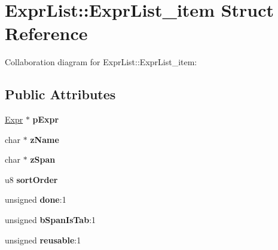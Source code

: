\hypertarget{struct_expr_list_1_1_expr_list__item}{\section{Expr\+List\+:\+:Expr\+List\+\_\+item Struct Reference}
\label{struct_expr_list_1_1_expr_list__item}
}


Collaboration diagram for Expr\+List\+:\+:Expr\+List\+\_\+item\+:
\subsection*{Public Attributes}
\begin{DoxyCompactItemize}
\item 
\hypertarget{struct_expr_list_1_1_expr_list__item_a75906cf3ff19e5bf16373fec7f3c79ad}{\hyperlink{struct_expr}{Expr} $\ast$ {\bfseries p\+Expr}}\label{struct_expr_list_1_1_expr_list__item_a75906cf3ff19e5bf16373fec7f3c79ad}

\item 
\hypertarget{struct_expr_list_1_1_expr_list__item_af278eb03a1169c73d144547adaf9b04f}{char $\ast$ {\bfseries z\+Name}}\label{struct_expr_list_1_1_expr_list__item_af278eb03a1169c73d144547adaf9b04f}

\item 
\hypertarget{struct_expr_list_1_1_expr_list__item_ade485bb6fafb44ec2aba59d05b8d117b}{char $\ast$ {\bfseries z\+Span}}\label{struct_expr_list_1_1_expr_list__item_ade485bb6fafb44ec2aba59d05b8d117b}

\item 
\hypertarget{struct_expr_list_1_1_expr_list__item_af9084dc073f96792c0c7a8a894778881}{u8 {\bfseries sort\+Order}}\label{struct_expr_list_1_1_expr_list__item_af9084dc073f96792c0c7a8a894778881}

\item 
\hypertarget{struct_expr_list_1_1_expr_list__item_a0100abfbd214ec2199dd25e4bce05dcb}{unsigned {\bfseries done}\+:1}\label{struct_expr_list_1_1_expr_list__item_a0100abfbd214ec2199dd25e4bce05dcb}

\item 
\hypertarget{struct_expr_list_1_1_expr_list__item_a05e84a6dbbf69cea042d3bf888955999}{unsigned {\bfseries b\+Span\+Is\+Tab}\+:1}\label{struct_expr_list_1_1_expr_list__item_a05e84a6dbbf69cea042d3bf888955999}

\item 
\hypertarget{struct_expr_list_1_1_expr_list__item_a066f924fb690e78cd2833770f737a13b}{unsigned {\bfseries reusable}\+:1}\label{struct_expr_list_1_1_expr_list__item_a066f924fb690e78cd2833770f737a13b}


\end{DoxyCompactItemize}
